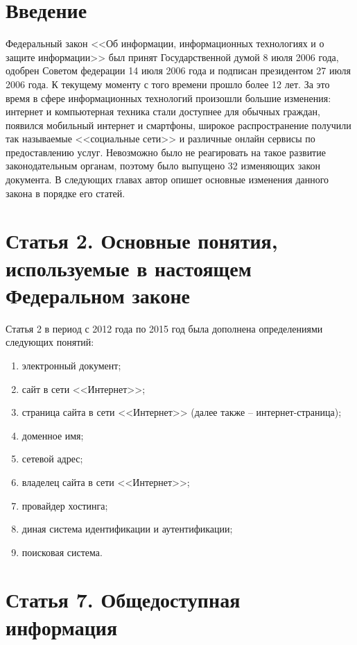 





\tableofcontents
\newpage

\section{Введение}

Федеральный закон <<Об информации, информационных технологиях и о защите информации>> был принят Государственной думой 8 июля 2006 года, одобрен Советом федерации 14 июля 2006 года и подписан президентом 27 июля 2006 года. К текущему моменту с того времени прошло более 12 лет. За это время в сфере информационных технологий произошли большие изменения: интернет и компьютерная техника стали доступнее для обычных граждан, появился мобильный интернет и смартфоны, широкое распространение получили так называемые <<социальные сети>> и различные онлайн сервисы по предоставлению услуг. Невозможно было не реагировать на такое развитие законодательным органам, поэтому было выпущено 32 изменяющих закон документа. В следующих главах автор опишет основные изменения данного закона в порядке его статей.

\section{Статья 2. Основные понятия, используемые в настоящем Федеральном законе}

Статья 2 в период с 2012 года по 2015 год была дополнена определениями следующих понятий: 

\begin{enumerate}
	\item электронный документ;
	\item сайт в сети <<Интернет>>;
	\item страница сайта в сети <<Интернет>> (далее также -- интернет-страница);
	\item доменное имя;
	\item сетевой адрес;
	\item владелец сайта в сети <<Интернет>>;
	\item провайдер хостинга;
	\item диная система идентификации и аутентификации;
	\item поисковая система.
\end{enumerate} 

\section{Статья 7. Общедоступная информация}

